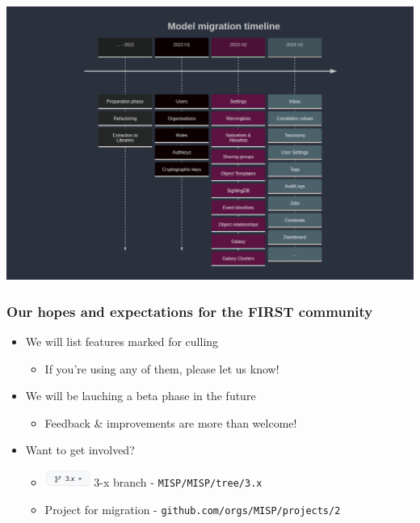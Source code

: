 \begin{frame}
    \begin{center}
        \includegraphics[width=0.99\linewidth]{pictures/timeline.png}
    \end{center}
\end{frame}

\begin{frame}
    \frametitle{Our hopes and expectations for the FIRST community}
    \begin{itemize}
        \item We will list features marked for culling
        \begin{itemize}
            \item If you're using any of them, please let us know!
        \end{itemize}
        \item We will be lauching a beta phase in the future
        \begin{itemize}
            \item Feedback \& improvements are more than welcome!
        \end{itemize}
        \item Want to get involved?
        \begin{itemize}
            \item \includegraphics[width=4em]{pictures/3x-branch.png} 3-x branch - \texttt{\scriptsize MISP/MISP/tree/3.x}
            \item {} Project for migration - \texttt{\scriptsize github.com/orgs/MISP/projects/2}
        \end{itemize}
    \end{itemize}
\end{frame}
